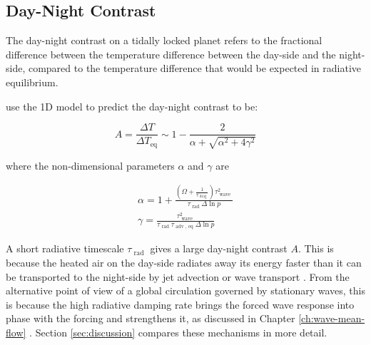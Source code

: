 \subsection{Day-Night Contrast}\label{sec:day-night-contrast}

The day-night contrast on a tidally locked planet refers to the fractional difference between the temperature difference between the day-side and the night-side, compared to the temperature difference that would be expected in radiative equilibrium.

\citet{zhang2017dynamics} use the 1D model to predict the day-night contrast to be:

\begin{equation}\label{eqn:zhang-dnc}
  A=\frac{\Delta T}{\Delta T_{\mathrm{eq}}} \sim 1-\frac{2}{\alpha+\sqrt{\alpha^{2}+4 \gamma^{2}}}
\end{equation}

where the non-dimensional parameters $\alpha$ and $\gamma$ are

\begin{equation}
  \begin{gathered}
\alpha=1+\frac{\left(\Omega+\frac{1}{\tau_{\text { drag }}}\right) \tau_{\text { wave }}^{2}}{\tau_{\text { rad }} \Delta \ln p} \\
\gamma=\frac{\tau_{\text { wave }}^{2}}{\tau_{\text { rad }} \tau_{\text { adv }, \text { eq }} \Delta \ln p}
\end{gathered}
\end{equation}

A short radiative timescale $\tau_{\text { rad }}$ gives a large day-night contrast $A$. This is because the heated air on the day-side radiates away its energy faster than it can be transported to the night-side by jet advection or wave transport \citep{zhang2017dynamics, hammond2017climate}. From the alternative point of view of a global circulation governed by stationary waves, this is because the high radiative damping rate brings the forced wave response into phase with the forcing and strengthens it, as discussed in Chapter \ref{ch:wave-mean-flow} \citep{hammond2018wavemean}. Section \ref{sec:discussion} compares these mechanisms in more detail.



